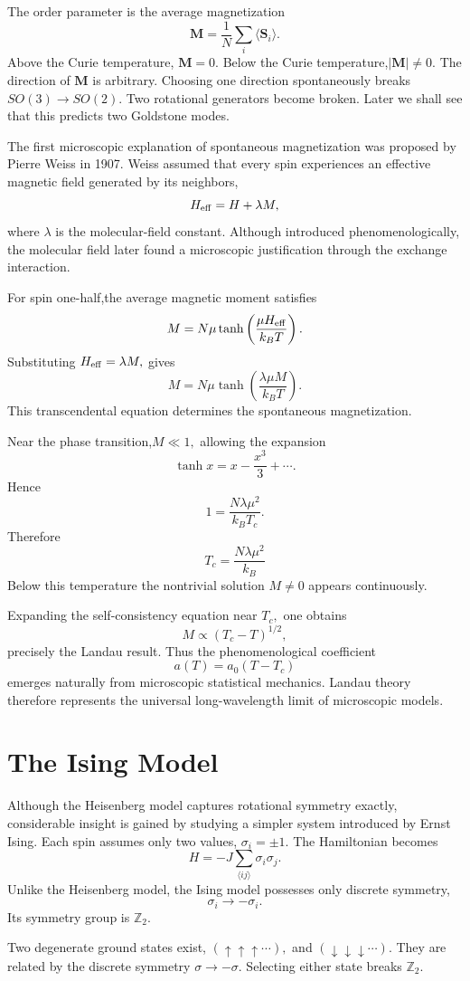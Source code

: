 The order parameter is the average magnetization
\[\mathbf M=\frac{1}{N} \sum_i\langle \mathbf S_i \rangle .\]
Above the Curie temperature, $\mathbf M=0.$
Below the Curie temperature,$|\mathbf M|\neq 0.$
The direction of $\mathbf M$ is arbitrary.
Choosing one direction spontaneously breaks $SO(3) \rightarrow SO(2).$
Two rotational generators become broken.
Later we shall see that this predicts two Goldstone modes.

The first microscopic explanation of spontaneous magnetization was
proposed by Pierre Weiss in 1907.
Weiss assumed that every spin experiences an effective magnetic field
generated by its neighbors,
\[H_{\rm eff}=H+\lambda M,\]
where $\lambda$ is the molecular-field constant.
Although introduced phenomenologically, the molecular field later found
a microscopic justification through the exchange interaction.

For spin one-half,the average magnetic moment satisfies
\[M=N\mu\tanh\left(\frac{\mu H_{\rm eff}}{k_BT}\right).\]
Substituting $H_{\rm eff}=\lambda M,$ gives
\[M=N\mu\tanh\left(\frac{\lambda\mu M}{k_BT}\right).\]
This transcendental equation determines the spontaneous
magnetization.

Near the phase transition,$M\ll 1,$ allowing the expansion
\[\tanh x=x-\frac{x^3}{3}+\cdots.\]
Hence
\[1=\frac{N\lambda\mu^2}{k_BT_c}.\]
Therefore
\[\boxed{T_c=\frac{N\lambda\mu^2}{k_B}}\]
Below this temperature the nontrivial solution $M \neq 0$ appears continuously.

Expanding the self-consistency equation near $T_c,$ one obtains
\[M \propto (T_c-T)^{1/2},\]
precisely the Landau result.
Thus the phenomenological coefficient
\[a(T)=a_0(T-T_c)\]
emerges naturally from microscopic statistical mechanics.
Landau theory therefore represents the universal long-wavelength limit
of microscopic models.

\section{The Ising Model}
Although the Heisenberg model captures rotational symmetry exactly,
considerable insight is gained by studying a simpler system introduced
by Ernst Ising.
Each spin assumes only two values, $\sigma_i=\pm 1.$
The Hamiltonian becomes
\[H=-J\sum_{\langle ij\rangle}\sigma_i\sigma_j.\]
Unlike the Heisenberg model,
the Ising model possesses only discrete symmetry,
\[\sigma_i \rightarrow -\sigma_i.\]
Its symmetry group is $\mathbb Z_2.$

Two degenerate ground states exist,
$(\uparrow\uparrow\uparrow\cdots),$ and
$(\downarrow\downarrow\downarrow\cdots).$
They are related by the discrete symmetry
$\sigma \rightarrow -\sigma.$
Selecting either state breaks $\mathbb Z_2.$

